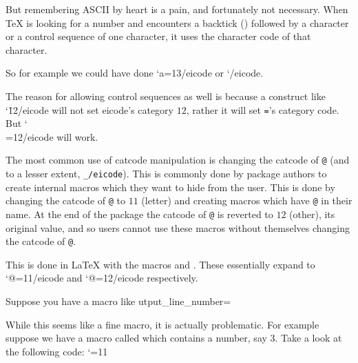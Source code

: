 {{        But remembering ASCII by heart is a pain, and fortunately not necessary.
        When \TeX{} is looking for a number and encounters a backtick ({\tt{}}) followed by a character or a control sequence of one character, it uses the character code of that character.

        So for example we could have done \icode \catcode`a=13/eicode{} or \icode \catcode`/eicode.

        The reason for allowing control sequences as well is because a construct like \icode \catcode`\=12/eicode{} will not set \icode\/eicode's category $12$, rather it will set {\tt=}'s category code.
        But \icode \catcode`\\=12/eicode{} will work.
    \endtextbox

\endslide 

\beginslide
    \oheadline

    \textbox\empty{1cm}{2cm}{\hsize-2cm}{}
        The most common use of catcode manipulation is changing the catcode of {\tt @} (and to a lesser extent, {\tt\icode _/eicode}).
        This is commonly done by package authors to create internal macros which they want to hide from the user.
        This is done by changing the catcode of {\tt @} to $11$ (letter) and creating macros which have {\tt @} in their name.
        At the end of the package the catcode of {\tt @} is reverted to $12$ (other), its original value, and so users cannot use these macros without themselves changing the catcode of {\tt @}.

        This is done in \LaTeX{} with the macros \macroname\makeatletter{} and \macroname\makeatother.
        These essentially expand to \icode \catcode`@=11/eicode{} and \icode \catcode`@=12/eicode{} respectively.
    \endtextbox

\endslide

\beginslide
    \oheadline

    \textbox\empty{1cm}{2cm}{\hsize-2cm}{}
        Suppose you have a macro like
\let\_output_line_number=\@gobble
\def\syntax@buf{.25cm}
\beginhi
\def\makeatletter{\catcode`\@=11}
\endhi

        While this seems like a fine macro, it is actually problematic.
        For example suppose we have a macro called \macroname\version@name{} which contains a number, say $3$.
        Take a look at the following code:
\beginhi
\makeatletter
\version@name
\endhi

}}
